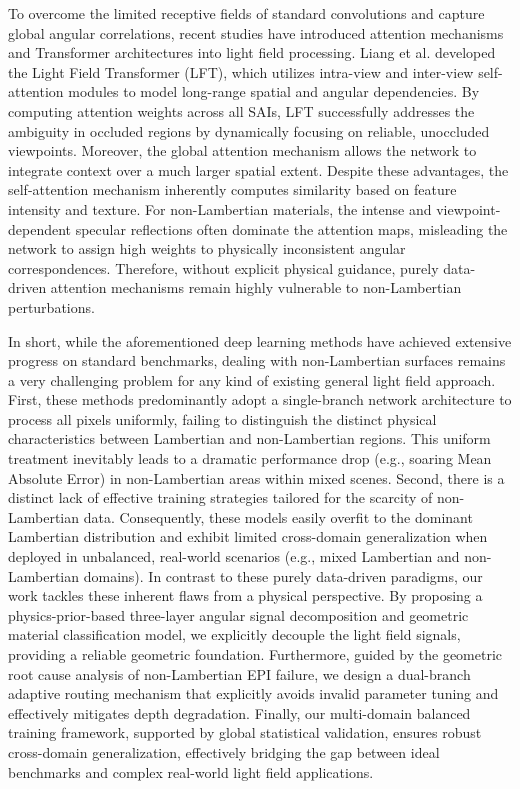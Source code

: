 \documentclass[lettersize,journal]{IEEEtran}
\begin{document}
To overcome the limited receptive fields of standard convolutions and capture global angular correlations, recent studies have introduced attention mechanisms and Transformer architectures into light field processing. Liang et al. \cite{Liang,Light_Field_Transformer} developed the Light Field Transformer (LFT), which utilizes intra-view and inter-view self-attention modules to model long-range spatial and angular dependencies. By computing attention weights across all SAIs, LFT successfully addresses the ambiguity in occluded regions by dynamically focusing on reliable, unoccluded viewpoints. Moreover, the global attention mechanism allows the network to integrate context over a much larger spatial extent. Despite these advantages, the self-attention mechanism inherently computes similarity based on feature intensity and texture. For non-Lambertian materials, the intense and viewpoint-dependent specular reflections often dominate the attention maps, misleading the network to assign high weights to physically inconsistent angular correspondences. Therefore, without explicit physical guidance, purely data-driven attention mechanisms remain highly vulnerable to non-Lambertian perturbations.

In short, while the aforementioned deep learning methods have achieved extensive progress on standard benchmarks, dealing with non-Lambertian surfaces remains a very challenging problem for any kind of existing general light field approach. First, these methods predominantly adopt a single-branch network architecture to process all pixels uniformly, failing to distinguish the distinct physical characteristics between Lambertian and non-Lambertian regions. This uniform treatment inevitably leads to a dramatic performance drop (e.g., soaring Mean Absolute Error) in non-Lambertian areas within mixed scenes. Second, there is a distinct lack of effective training strategies tailored for the scarcity of non-Lambertian data. Consequently, these models easily overfit to the dominant Lambertian distribution and exhibit limited cross-domain generalization when deployed in unbalanced, real-world scenarios (e.g., mixed Lambertian and non-Lambertian domains). In contrast to these purely data-driven paradigms, our work tackles these inherent flaws from a physical perspective. By proposing a physics-prior-based three-layer angular signal decomposition and geometric material classification model, we explicitly decouple the light field signals, providing a reliable geometric foundation. Furthermore, guided by the geometric root cause analysis of non-Lambertian EPI failure, we design a dual-branch adaptive routing mechanism that explicitly avoids invalid parameter tuning and effectively mitigates depth degradation. Finally, our multi-domain balanced training framework, supported by global statistical validation, ensures robust cross-domain generalization, effectively bridging the gap between ideal benchmarks and complex real-world light field applications.
\end{document}

